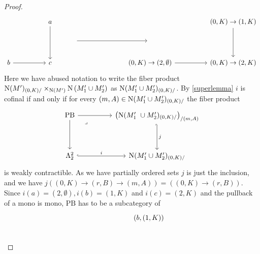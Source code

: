 \documentclass[../../thesis.tex]{subfiles}
\begin{document}
\begin{proof}
    \[\begin{tikzcd}
            && a &&&&&& {(0,K)\to(1,K)} \\
            &&& {} &&& {} \\
            b && c &&&& {(0,K)\to(2,\emptyset)} && {(0,K)\to(2,K)}
            \arrow[from=1-9, to=3-9]
            \arrow[from=3-7, to=3-9]
            \arrow[from=3-1, to=3-3]
            \arrow[from=1-3, to=3-3]
            \arrow[from=2-4, to=2-7]
        \end{tikzcd}\]
    Here we have abused notation to write the fiber product $\mathrm{N}(M')_{(0, K) /} \times_{\mathrm{N}(M')}\mathrm{N}\left(M_1^{\prime} \cup M_2^{\prime}\right)$ as $ \mathrm{N}(M_1'\cup M_2')_{(0,K)/}$. By \ref{superlemma} $i$ is cofinal if and only if for every $(m,A) \in \mathrm{N}(M_1'\cup M_2')_{(0,K)/}$ the fiber product
    \[\begin{tikzcd}
            {\mathrm{PB}} && {\left(\Nerve(M_1' \cup M_2')_{(0,K)/}\right)_{/(m,A)}} \\
            \\
            {\Lambda_2^2} && {\Nerve(M_1'\cup M_2')_{(0,K)/}}
            \arrow[from=1-1, to=1-3]
            \arrow["j", hook',from=1-3, to=3-3]
            \arrow["i", hook,from=3-1, to=3-3]
            \arrow[from=1-1, to=3-1]
            \arrow["\lrcorner"{anchor=center, pos=0.125}, draw=none, from=1-1, to=3-3]
        \end{tikzcd}\]
    is weakly contractible.
    As we have partially ordered sets
    $j$ is just the inclusion, and we have $j((0,K) \to (r, B) \to (m,A))=((0,K) \to (r,B))$.
    Since $i(a)=(2,\emptyset), i(b)=(1,K)$ and $i(c)=(2,K)$ and the pullback of a mono is mono, $\mathrm{PB}$ has to be a subcategory of
    \[\begin{tikzcd}
            && {(b,(1,K))} \\

\end{tikzcd}\]
\end{proof}
\end{document}
